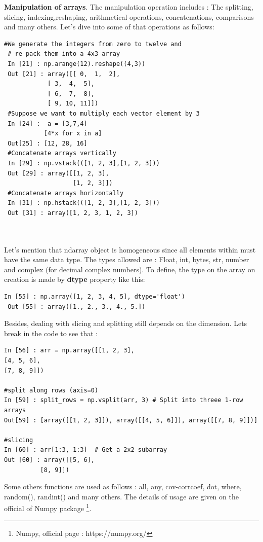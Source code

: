 \documentclass[12pt,a4paper]{report}
\begin{document}
 \noindent\textbf{Manipulation of arrays}. The manipulation operation includes : The splitting, slicing, indexing,reshaping, arithmetical operations, concatenations, comparisons and many others. Let's dive into some of that operations as follows:
 \begin{lstlisting}[style=stylepython] 
 #We generate the integers from zero to twelve and
 # re pack them into a 4x3 array
 In [21] : np.arange(12).reshape((4,3))  
 Out [21] : array([[ 0,  1,  2],
 		    [ 3,  4,  5],
 		    [ 6,  7,  8],
 		    [ 9, 10, 11]]) 
 #Suppose we want to multiply each vector element by 3
 In [24] :  a = [3,7,4] 
           [4*x for x in a]
 Out[25] : [12, 28, 16]  
 #Concatenate arrays vertically  
 In [29] : np.vstack(([1, 2, 3],[1, 2, 3]))  
 Out [29] : array([[1, 2, 3],
                   [1, 2, 3]]) 
 #Concatenate arrays horizontally
 In [31] : np.hstack(([1, 2, 3],[1, 2, 3]))
 Out [31] : array([1, 2, 3, 1, 2, 3])   
 
 
 \end{lstlisting} 
 Let's mention that ndarray object is homogeneous since all elements within must have the same data type. The types allowed are : Float, int, bytes, str, number and complex (for decimal complex numbers). To define, the type on the array on creation is made by \textbf{dtype} property like this: 
\begin{lstlisting}[style=stylepython] 
 In [55] : np.array([1, 2, 3, 4, 5], dtype='float') 
 Out [55] : array([1., 2., 3., 4., 5.]) 
\end{lstlisting} 

Besides, dealing with slicing and splitting still depends on the dimension. Lets break in the code to see that : 
\begin{lstlisting}[style=stylepython]
In [56] : arr = np.array([[1, 2, 3],
[4, 5, 6],
[7, 8, 9]]) 

#split along rows (axis=0)
In [59] : split_rows = np.vsplit(arr, 3) # Split into threee 1-row arrays
Out[59] : [array([[1, 2, 3]]), array([[4, 5, 6]]), array([[7, 8, 9]])]

#slicing 
In [60] : arr[1:3, 1:3]  # Get a 2x2 subarray
Out [60] : array([[5, 6],
		  [8, 9]])
\end{lstlisting}   
 Some others functions are used as follows : all, any, cov-corrcoef, dot, where, random(), randint() and many others. The details of usage are given on the official of Numpy package \footnote{Numpy, official page : https://numpy.org/}.
\\
\end{document}
